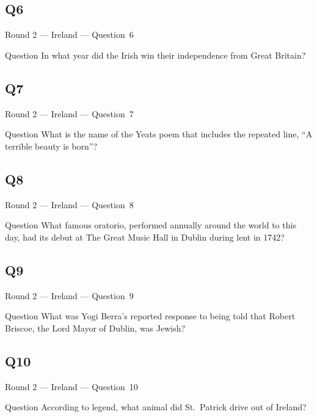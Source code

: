 \documentclass[11pt]{beamer}
\begin{document}
\subsection*{Q6}
\begin{frame}[t]{Round 2 --- Ireland --- \mbox{Question 6}}
\vspace{-0.5em}
\begin{block}{Question}
In what year did the Irish win their independence from Great Britain?
\end{block}
\end{frame}
\subsection*{Q7}
\begin{frame}[t]{Round 2 --- Ireland --- \mbox{Question 7}}
\vspace{-0.5em}
\begin{block}{Question}
What  is the name of the Yeats poem that includes the repeated line, ``A terrible beauty is born''?
\end{block}
\end{frame}
\subsection*{Q8}
\begin{frame}[t]{Round 2 --- Ireland --- \mbox{Question 8}}
\vspace{-0.5em}
\begin{block}{Question}
What famous oratorio, performed annually around the world to this day, had its debut at The Great Music Hall in Dublin during lent in 1742? 
\end{block}
\end{frame}
\subsection*{Q9}
\begin{frame}[t]{Round 2 --- Ireland --- \mbox{Question 9}}
\vspace{-0.5em}
\begin{block}{Question}
What was Yogi Berra's reported response to being told that Robert Briscoe, the Lord Mayor of Dublin, was Jewish?
\end{block}
\end{frame}
\subsection*{Q10}
\begin{frame}[t]{Round 2 --- Ireland --- \mbox{Question 10}}
\vspace{-0.5em}
\begin{block}{Question}
According to legend, what animal did St.\ Patrick drive out of Ireland?
\end{block}
\end{frame}
\end{document}
